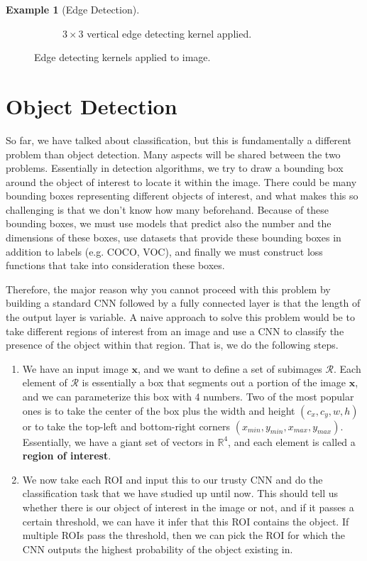 \documentclass{article}
\theoremstyle{definition}
\newtheorem{example}{Example}[section]
\theoremstyle{remark}
\theoremstyle{definition}
\begin{document}
\begin{example}[Edge Detection]
\begin{figure}[hbt!]
\begin{subfigure}[b]{0.45\textwidth}
        \caption{$3 \times 3$ vertical edge detecting kernel applied. }
        \label{fig:d}
    \end{subfigure}

    \label{fig:cats_histogram}
    \caption{Edge detecting kernels applied to image. }
\end{figure}
\end{example}

\section{Object Detection} 

  So far, we have talked about classification, but this is fundamentally a different problem than object detection. Many aspects will be shared between the two problems. Essentially in detection algorithms, we try to draw a bounding box around the object of interest to locate it within the image. There could be many bounding boxes representing different objects of interest, and what makes this so challenging is that we don't know how many beforehand. Because of these bounding boxes, we must use models that predict also the number and the dimensions of these boxes, use datasets that provide these bounding boxes in addition to labels (e.g. COCO, VOC), and finally we must construct loss functions that take into consideration these boxes. 

  Therefore, the major reason why you cannot proceed with this problem by building a standard CNN followed by a fully connected layer is that the length of the output layer is variable. A naive approach to solve this problem would be to take different regions of interest from an image and use a CNN to classify the presence of the object within that region. That is, we do the following steps. 
  \begin{enumerate}
    \item We have an input image $\mathbf{x}$, and we want to define a set of subimages $\mathcal{R}$. Each element of $\mathcal{R}$ is essentially a box that segments out a portion of the image $\mathbf{x}$, and we can parameterize this box with 4 numbers. Two of the most popular ones is to take the center of the box plus the width and height $(c_x, c_y, w, h)$ or to take the top-left and bottom-right corners $(x_{min}, y_{min}, x_{max}, y_{max})$. Essentially, we have a giant set of vectors in $\mathbb{R}^4$, and each element is called a \textbf{region of interest}. 
    \item We now take each ROI and input this to our trusty CNN and do the classification task that we have studied up until now. This should tell us whether there is our object of interest in the image or not, and if it passes a certain threshold, we can have it infer that this ROI contains the object. If multiple ROIs pass the threshold, then we can pick the ROI for which the CNN outputs the highest probability of the object existing in.  
  \end{enumerate}
\end{document}

